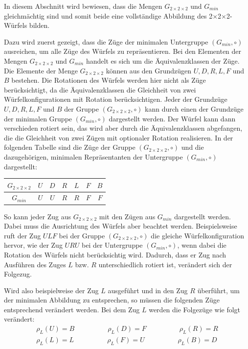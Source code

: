 \documentclass[12pt,a4paper, usenames, dvipsnames]{article}
\theoremstyle{mystyle}
\theoremstyle{definition}
\newcommand{\Gtwo}{\ensuremath{G_{2\times 2\times 2}}}
\newcommand{\Ttwo}{2$\times$2$\times$2-}
\begin{document}

In diesem Abschnitt wird bewiesen, dass die Mengen $\Gtwo$ und $G_{min}$ gleichmächtig sind und somit beide eine vollständige Abbildung des \Ttwo Würfels bilden. 

Dazu wird zuerst gezeigt, dass die Züge der minimalen Untergruppe $(G_{min}, \circ)$ ausreichen, um alle Züge des Würfels zu repräsentieren. Bei den Elementen der Mengen $\Gtwo$ und $G_{min}$ handelt es sich um die Äquivalenzklassen der Züge. Die Elemente der Menge $\Gtwo$ können aus den Grundzügen $U, D, R, L, F$ und $B$ bestehen. Die Rotationen des Würfels werden hier nicht als Züge berücksichtigt, da die Äquivalenzklassen die Gleichheit von zwei Würfelkonfigurationen mit Rotation berücksichtigen.
Jeder der Grundzüge $U, D, R, L, F$ und $B$ der Gruppe $(\Gtwo, \circ)$ kann durch einen der Grundzüge der minimalen Gruppe $(G_{min}, \circ)$ dargestellt werden. Der Würfel kann dann verschieden rotiert sein, das wird aber durch die Äquivalenzklassen abgefangen, die die Gleichheit von zwei Zügen mit optionaler Rotation realisieren. In der folgenden Tabelle sind die Züge der Gruppe $(\Gtwo, \circ)$ und die dazugehörigen, minimalen Repräsentanten der Untergruppe $(G_{min}, \circ)$ dargestellt:

\begin{center}
\begin{tabular}{c c c c c c c }
$\Gtwo$ & $U$ & $D$ & $R$  & $L$  & $F$  & $B$  \\
\midrule
$G_{min}$ & $U$ & $U$ & $R$  & $R$  & $F$  & $F$  \\
\end{tabular}
\end{center}

So kann jeder Zug aus $\Gtwo$ mit den Zügen aus $G_{min}$ dargestellt werden. Dabei muss die Ausrichtung des Würfels aber beachtet werden. Beispielsweise ruft der Zug $ULF$ bei der Gruppe $(\Gtwo, \circ)$ die gleiche Würfelkonfiguration hervor, wie der Zug $URU$ bei der Untergruppe $(G_{min}, \circ)$, wenn dabei die Rotation des Würfels nicht berücksichtig wird. Dadurch, dass er Zug nach Ausführen des Zuges $L$ bzw. $R$ unterschiedlich rotiert ist, verändert sich der Folgezug.

Wird also beispielweise der Zug $L$ ausgeführt und in den Zug $R$ überführt, um der minimalen Abbildung zu entsprechen, so müssen die folgenden Züge entsprechend verändert werden. Bei dem Zug $L$ werden die Folgezüge wie folgt verändert:
\begin{align*}
\rho_L(U) = B \ \ \ \ \ \ \ \ \ \ \ \ \ \ \ \ \ \ \ \ \ \  \rho_L(D) = F \ \ \ \ \ \ \ \ \ \ \ \ \ \ \ \ \ \ \ \ \ \   \rho_L(R) = R \\
\rho_L(L) = L \ \ \ \ \ \ \ \ \ \ \ \ \ \ \ \ \ \ \ \ \ \  \rho_L(F) = U \ \ \ \ \ \ \ \ \ \ \ \ \ \ \ \ \ \ \ \ \ \  \rho_L(B) = D 
\end{align*}
\end{document}
